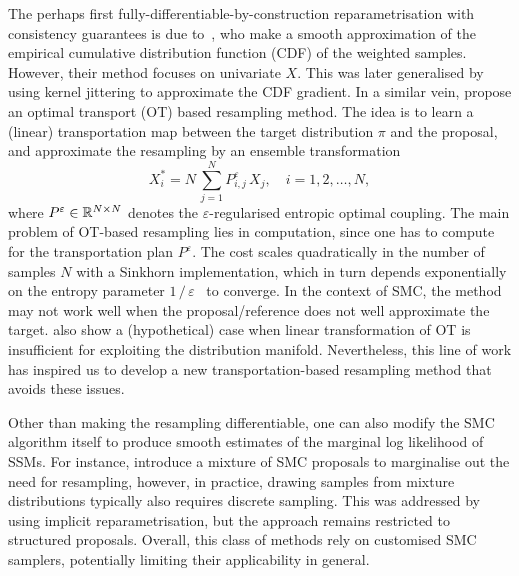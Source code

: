 \documentclass{article}
\begin{document}
The perhaps first fully-differentiable-by-construction reparametrisation with consistency guarantees is due to~\citet{Malik2011}, who make a smooth approximation of the empirical cumulative distribution function (CDF) of the weighted samples. 
However, their method focuses on univariate $X$. 
This was later generalised by~\citet{Li2024differentiable} using kernel jittering to approximate the CDF gradient. 
In a similar vein, \citet{Corenflos2021} propose an optimal transport (OT) based resampling method. 
The idea is to learn a (linear) transportation map between the target distribution $\pi$ and the proposal, and approximate the resampling by an ensemble transformation~\citep{Reich2013}
%
\begin{equation}
    X_i^* = N \, \sum_{j=1}^N P_{i, j}^{\varepsilon} \, X_{j}, \quad i=1,2,\ldots, N,
    \label{equ:eot}
\end{equation}
%
where $P^\varepsilon\in\mathbb{R}^{N\times N}$ denotes the $\varepsilon$-regularised entropic optimal coupling.
The main problem of OT-based resampling lies in computation, since one has to compute for the transportation plan $P^{\varepsilon}$. 
The cost scales quadratically in the number of samples $N$ with a Sinkhorn implementation, which in turn depends exponentially on the entropy parameter $1\,/\,\varepsilon$~\citep{Luo2023OT, Burns2025linear} to converge. 
In the context of SMC, the method may not work well when the proposal/reference does not well approximate the target. 
\citet[][Fig. 1]{Li2024differentiable} also show a (hypothetical) case when linear transformation of OT is insufficient for exploiting the distribution manifold. 
Nevertheless, this line of work has inspired us to develop a new transportation-based resampling method that avoids these issues. 

Other than making the resampling differentiable, one can also modify the SMC algorithm itself to produce smooth estimates of the marginal log likelihood of SSMs. 
For instance, \citet{Klaas2005} introduce a mixture of SMC proposals to marginalise out the need for resampling, however, in practice, drawing samples from mixture distributions typically also requires discrete sampling. 
This was addressed by~\citet{Lai2022} using implicit reparametrisation, but the approach remains restricted to structured proposals.
Overall, this class of methods rely on customised SMC samplers, potentially limiting their applicability in general. 
\end{document}

